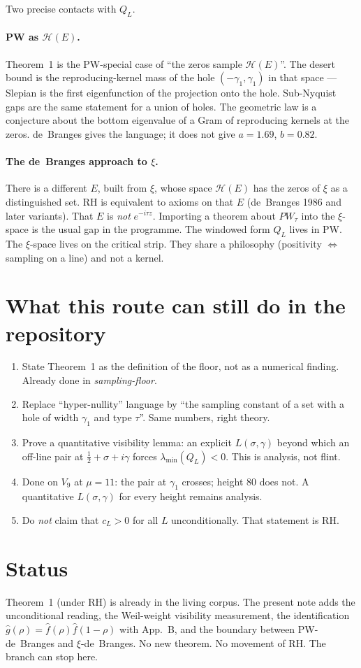 \documentclass[11pt]{article}
\theoremstyle{remark}\newtheorem*{remark}{Remark}
\begin{document}
Two precise contacts with $Q_L$.

\paragraph{PW as $\mathcal{H}(E)$.}
Theorem~1 is the PW-special case of ``the zeros sample $\mathcal{H}(E)$''.
The desert bound is the reproducing-kernel mass of the hole
$(-\gamma_1,\gamma_1)$ in that space --- Slepian is the first
eigenfunction of the projection onto the hole. Sub-Nyquist gaps are
the same statement for a union of holes. The geometric law is a
conjecture about the bottom eigenvalue of a Gram of reproducing
kernels at the zeros. de~Branges gives the language; it does not
give $a=1.69$, $b=0.82$.

\paragraph{The de~Branges approach to $\xi$.}
There is a different $E$, built from $\xi$, whose space $\mathcal{H}(E)$
has the zeros of $\xi$ as a distinguished set. RH is equivalent to
axioms on that $E$ (de~Branges 1986 and later variants). That $E$ is
\emph{not} $e^{-i\tau z}$. Importing a theorem about $PW_\tau$ into the
$\xi$-space is the usual gap in the programme. The windowed form
$Q_L$ lives in PW. The $\xi$-space lives on the critical strip. They
share a philosophy (positivity $\Leftrightarrow$ sampling on a line)
and not a kernel.

\section{What this route can still do in the repository}
\begin{enumerate}
\item State Theorem~1 as the definition of the floor, not as a
  numerical finding. Already done in \emph{sampling-floor}.
\item Replace ``hyper-nullity'' language by ``the sampling constant
  of a set with a hole of width $\gamma_1$ and type $\tau$''. Same
  numbers, right theory.
\item Prove a quantitative visibility lemma: an explicit $L(\sigma,\gamma)$
  beyond which an off-line pair at $\tfrac12+\sigma+i\gamma$ forces
  $\lambda_{\min}(Q_L)<0$. This is analysis, not flint.
\item Done on $V_9$ at $\mu=11$: the pair at $\gamma_1$ crosses;
  height $80$ does not. A quantitative $L(\sigma,\gamma)$ for every
  height remains analysis.
\item Do \emph{not} claim that $c_L>0$ for all $L$ unconditionally.
  That statement is RH.
\end{enumerate}

\section*{Status}
Theorem~1 (under RH) is already in the living corpus. The present note
adds the unconditional reading, the Weil-weight visibility measurement,
the identification $\hat g(\rho)=\hat f(\rho)\hat f(1-\rho)$ with App.~B,
and the boundary between PW-de~Branges and $\xi$-de~Branges. No new
theorem. No movement of RH. The branch can stop here.
\end{document}
